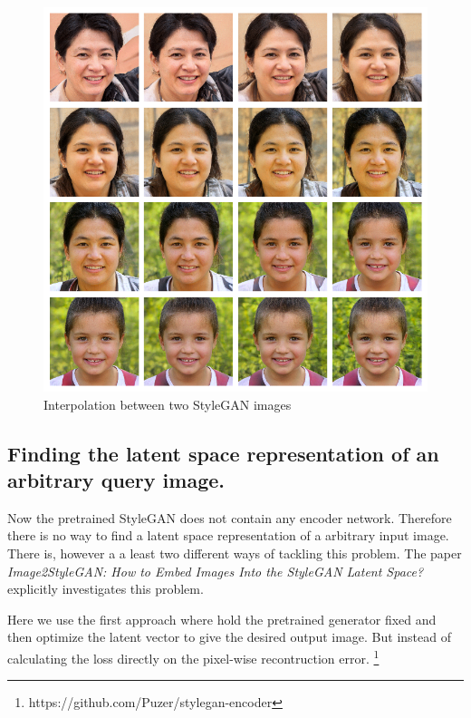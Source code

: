 \begin{figure}
  \includegraphics[width=\textwidth]{fig/stylegan/interpolation}
  \caption{Interpolation between two StyleGAN images}
  \label{StyleGAN-interpolation}
\end{figure}


\subsection{Finding the latent space representation of an arbitrary query image.}
Now the pretrained StyleGAN does not contain any encoder network. Therefore there is no way to find a latent space representation of a arbitrary input image.
There is, however a a least two different ways of tackling this problem.
%
\cite{interfacegan}
The paper \textit{Image2StyleGAN: How to Embed Images Into the StyleGAN Latent Space?}\cite{Image2StyleGAN} explicitly investigates this problem.


Here we use the first approach where hold the pretrained generator fixed and then optimize the latent vector to give the desired output image. But instead of calculating the loss directly on the pixel-wise recontruction error.
\footnote{https://github.com/Puzer/stylegan-encoder}



